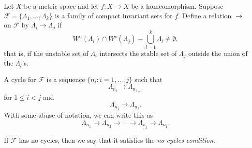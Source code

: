 \documentclass[12pt]{article}
\begin{document}
Let $X$ be a metric space and let $f\colon X\to X$ be a homeomorphism.
Suppose $\mathcal F= \{\Lambda_1,\dots,\Lambda_k\}$ is a family of compact invariant sets for $f$. Define a relation $\rightarrow$ on $\mathcal{F}$ by $\Lambda_i \rightarrow \Lambda_j$ if $$W^u(\Lambda_i)\cap W^s(\Lambda_j) - \bigcup_{l=1}^k \Lambda_l \neq \emptyset,$$
that is, if the unstable set of $\Lambda_i$ intersects the stable set of $\Lambda_j$ outside the union of the $\Lambda_l$'s.

A cycle for $\mathcal F$ is a sequence $\{n_i:i=1,\dots,j\}$ such that 
$$\Lambda_{n_i}\rightarrow \Lambda_{n_{i+1}}$$
for $1\leq i<j$ and 
$$\Lambda_{n_j}\rightarrow \Lambda_{n_1}.$$
With some abuse of notation, we can write this as
$$\Lambda_{n_1}\rightarrow\Lambda_{n_2}\rightarrow\cdots\rightarrow\Lambda_{n_j}\rightarrow\Lambda_{n_1}.$$

If $\mathcal{F}$ has no cycles, then we say that it satisfies the \emph{no-cycles condition}.
\end{document}
